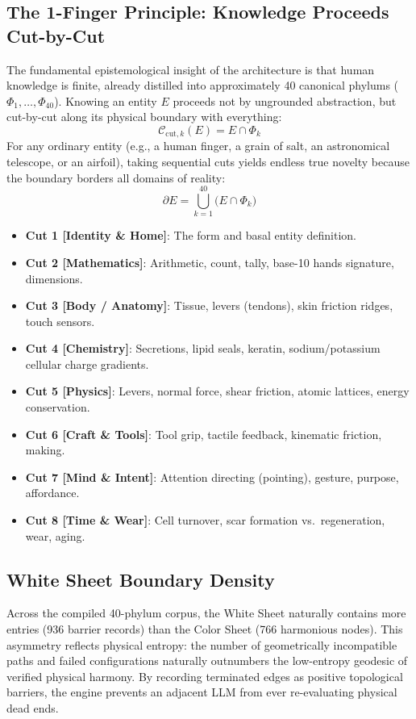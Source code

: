 \documentclass[11pt,a4paper]{article}
\begin{document}
\subsection{The 1-Finger Principle: Knowledge Proceeds Cut-by-Cut}
The fundamental epistemological insight of the architecture is that human knowledge is finite, already distilled into approximately 40 canonical phylums ($\Phi_1, \dots, \Phi_{40}$). Knowing an entity $E$ proceeds not by ungrounded abstraction, but cut-by-cut along its physical boundary with everything:
\begin{equation}
    \mathcal{C}_{\text{cut}, k}(E) = E \cap \Phi_k
\end{equation}
For any ordinary entity (e.g., a human finger, a grain of salt, an astronomical telescope, or an airfoil), taking sequential cuts yields endless true novelty because the boundary borders all domains of reality:
\begin{equation}
    \partial E = \bigcup_{k=1}^{40} \big(E \cap \Phi_k\big)
\end{equation}
\begin{itemize}
    \item \textbf{Cut 1 [Identity \& Home]}: The form and basal entity definition.
    \item \textbf{Cut 2 [Mathematics]}: Arithmetic, count, tally, base-10 hands signature, dimensions.
    \item \textbf{Cut 3 [Body / Anatomy]}: Tissue, levers (tendons), skin friction ridges, touch sensors.
    \item \textbf{Cut 4 [Chemistry]}: Secretions, lipid seals, keratin, sodium/potassium cellular charge gradients.
    \item \textbf{Cut 5 [Physics]}: Levers, normal force, shear friction, atomic lattices, energy conservation.
    \item \textbf{Cut 6 [Craft \& Tools]}: Tool grip, tactile feedback, kinematic friction, making.
    \item \textbf{Cut 7 [Mind \& Intent]}: Attention directing (pointing), gesture, purpose, affordance.
    \item \textbf{Cut 8 [Time \& Wear]}: Cell turnover, scar formation vs.\ regeneration, wear, aging.
\end{itemize}

\subsection{White Sheet Boundary Density}
Across the compiled 40-phylum corpus, the White Sheet naturally contains more entries (936 barrier records) than the Color Sheet (766 harmonious nodes). This asymmetry reflects physical entropy: the number of geometrically incompatible paths and failed configurations naturally outnumbers the low-entropy geodesic of verified physical harmony. By recording terminated edges as positive topological barriers, the engine prevents an adjacent LLM from ever re-evaluating physical dead ends.
\end{document}
